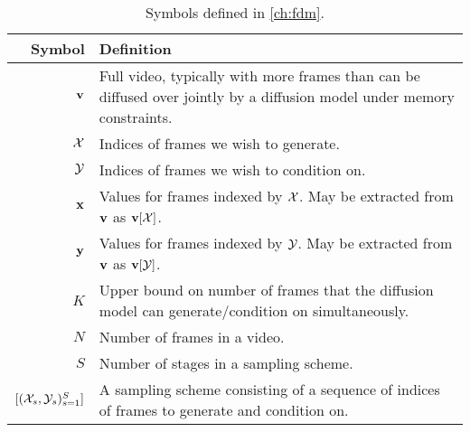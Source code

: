 \begin{table*}
  \caption{Symbols defined in \cref{ch:fdm}.}
  \label{tab:notation-appendix-fdm}
  \centering
  \footnotesize
  \begin{tabular}{rp{9cm}}
    \toprule
    Symbol    & Definition   \\
    \midrule
    ${\mathbf{v}}$                                  & Full video, typically with more frames than can be diffused over jointly by a diffusion model under memory constraints. \\
    ${\mathcal{X}}$                                  & Indices of frames we wish to generate. \\
    ${\mathcal{Y}}$                                  & Indices of frames we wish to condition on. \\
    ${\mathbf{x}}$                                 & Values for frames indexed by ${\mathcal{X}}$. May be extracted from ${\mathbf{v}}$ as ${\mathbf{v}}[{\mathcal{X}}]$. \\
    ${\mathbf{y}}$                                 & Values for frames indexed by ${\mathcal{Y}}$. May be extracted from ${\mathbf{v}}$ as ${\mathbf{v}}[{\mathcal{Y}}]$. \\
    $K$                                    & Upper bound on number of frames that the diffusion model can generate/condition on simultaneously. \\
    $N$                                    & Number of frames in a video. \\
    $S$                                    & Number of stages in a sampling scheme. \\
    $[ ({\mathcal{X}}_s, {\mathcal{Y}}_s)_{s=1}^S ]$           & A sampling scheme consisting of a sequence of indices of frames to generate and condition on. \\
    \bottomrule
  \end{tabular}
\end{table*}